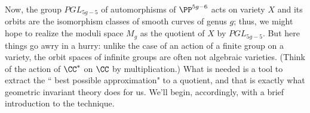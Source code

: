  


Now, the group $PGL_{5g-5}$ of automorphisms of $\PP^{5g-6}$ acts on variety $X$ and its orbits
are the isomorphism classes of smooth curves of genus $g$; thus, we might hope to realize the moduli space $M_g$ as the quotient of $X$ by $PGL_{5g-5}$. But here things go awry in a hurry: unlike the case of an action of a finite group on a variety,
the orbit spaces of infinite groups are often not algebraic varieties. (Think of the action of $\CC^*$ on $\CC$ by multiplication.) What is needed is a tool to extract the ``	best possible approximation" to a quotient, and that is exactly what geometric invariant theory does for us. We'll begin, accordingly, with a brief introduction to the technique.

